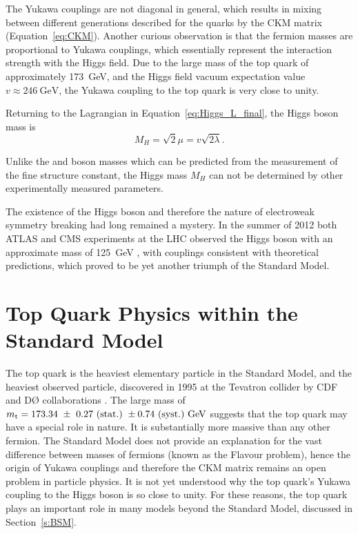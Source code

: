 The Yukawa couplings are not diagonal in general, which results in mixing between different generations described for
the quarks by the CKM matrix (Equation~\ref{eq:CKM}). Another curious observation is that the fermion masses are
proportional to Yukawa couplings, which essentially represent the interaction strength with the Higgs field. Due to the
large mass of the top quark of approximately \SI{173}{\GeV}, and the Higgs field vacuum expectation value
$v\approx\SI{246}{\GeV}$, the Yukawa coupling to the top quark is very close to unity.

Returning to the Lagrangian in Equation~\ref{eq:Higgs_L_final}, the Higgs boson mass is
\begin{equation}
M_H = \sqrt{2} \mu = v \sqrt{2\lambda}.
\end{equation}

Unlike the \W and \Z boson masses which can be predicted from the measurement of the fine structure constant, the Higgs
mass $M_H$ can not be determined by other experimentally measured parameters.


The existence of the Higgs boson and therefore the nature of electroweak symmetry breaking had long remained a mystery.
In the summer of 2012 both ATLAS and CMS experiments at the LHC observed the Higgs boson with an approximate mass of
\SI{125}{\GeV} \autocite{ATLAS_higgs_observation, CMS_higgs_observation}, with couplings consistent with theoretical
predictions, which proved to be yet another triumph of the Standard Model.

\newpage
\section{Top Quark Physics within the Standard Model}
\label{s:top_quak_physics}
The top quark is the heaviest elementary particle in the Standard Model, and the heaviest observed particle, discovered
in 1995 at the Tevatron collider by CDF and D{\O} collaborations \autocite{CDF_top_observation, D0_top_observation}. The
large mass of $\mtop = 173.34\ \pm\ 0.27\ \textrm{(stat.)}\ \pm 0.74\ \textrm{(syst.)}\ \textrm{GeV}$
\autocite{world_top_mass_combination} suggests that the top quark may have a special role in nature. It is substantially
more massive than any other fermion. The Standard Model does not provide an explanation for the vast difference between
masses of fermions (known as the Flavour problem), hence the origin of Yukawa couplings and therefore the CKM matrix
remains an open problem in particle physics. It is not yet understood why the top quark's Yukawa coupling to the Higgs
boson is so close to unity. For these reasons, the top quark plays an important role in many models beyond the Standard
Model, discussed in Section~\ref{s:BSM}.

